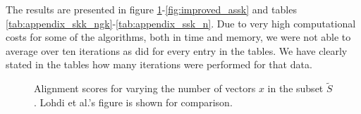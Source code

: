 
The results are presented in figure \ref{fig:alignment}-\ref{fig:improved_assk} and tables \ref{tab:appendix_skk_ngk}-\ref{tab:appendix_ssk_n}. Due to very high computational costs for some of the algorithms, both in time and memory, we were  not able to average over ten iterations as \cite{lodhi} did for every entry in the tables. We have clearly stated in the tables how many iterations were performed for that data. 

\begin{figure}[!htb]	
	\centering
	\caption{Alignment scores for varying the number of vectors $ x $ in the subset $ \tilde{S} $. Lohdi et al.'s figure is shown for comparison.\label{fig:alignment}}
\end{figure}



